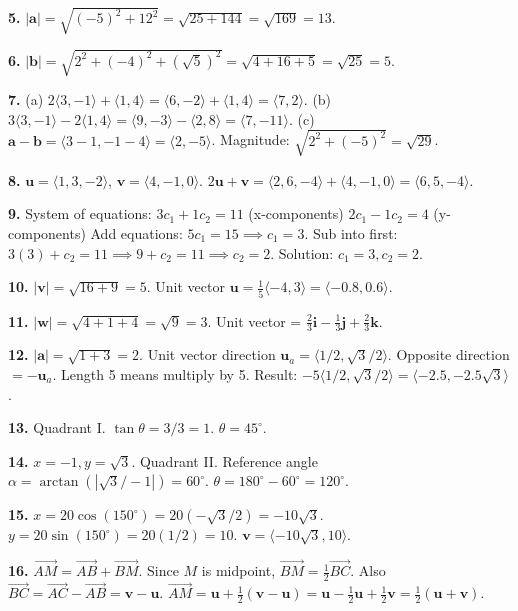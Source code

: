 \documentclass[12pt]{article}
\begin{document}
\textbf{5.} $|\mathbf{a}| = \sqrt{(-5)^2 + 12^2} = \sqrt{25 + 144} = \sqrt{169} = 13$.

\textbf{6.} $|\mathbf{b}| = \sqrt{2^2 + (-4)^2 + (\sqrt{5})^2} = \sqrt{4 + 16 + 5} = \sqrt{25} = 5$.

\textbf{7.}
(a) $2\langle 3, -1 \rangle + \langle 1, 4 \rangle = \langle 6, -2 \rangle + \langle 1, 4 \rangle = \langle 7, 2 \rangle$.
(b) $3\langle 3, -1 \rangle - 2\langle 1, 4 \rangle = \langle 9, -3 \rangle - \langle 2, 8 \rangle = \langle 7, -11 \rangle$.
(c) $\mathbf{a}-\mathbf{b} = \langle 3-1, -1-4 \rangle = \langle 2, -5 \rangle$. Magnitude: $\sqrt{2^2+(-5)^2} = \sqrt{29}$.

\textbf{8.} $\mathbf{u} = \langle 1, 3, -2 \rangle$, $\mathbf{v} = \langle 4, -1, 0 \rangle$.
$2\mathbf{u} + \mathbf{v} = \langle 2, 6, -4 \rangle + \langle 4, -1, 0 \rangle = \langle 6, 5, -4 \rangle$.

\textbf{9.} System of equations:
$3c_1 + 1c_2 = 11$ (x-components)
$2c_1 - 1c_2 = 4$ (y-components)
Add equations: $5c_1 = 15 \implies c_1 = 3$.
Sub into first: $3(3) + c_2 = 11 \implies 9 + c_2 = 11 \implies c_2 = 2$.
Solution: $c_1=3, c_2=2$.

\textbf{10.} $|\mathbf{v}| = \sqrt{16+9} = 5$. Unit vector $\mathbf{u} = \frac{1}{5}\langle -4, 3 \rangle = \langle -0.8, 0.6 \rangle$.

\textbf{11.} $|\mathbf{w}| = \sqrt{4+1+4} = \sqrt{9} = 3$. Unit vector = $\frac{2}{3}\mathbf{i} - \frac{1}{3}\mathbf{j} + \frac{2}{3}\mathbf{k}$.

\textbf{12.} $|\mathbf{a}| = \sqrt{1+3} = 2$. Unit vector direction $\mathbf{u}_a = \langle 1/2, \sqrt{3}/2 \rangle$.
Opposite direction $= -\mathbf{u}_a$. Length 5 means multiply by 5.
Result: $-5 \langle 1/2, \sqrt{3}/2 \rangle = \langle -2.5, -2.5\sqrt{3} \rangle$.

\textbf{13.} Quadrant I. $\tan \theta = 3/3 = 1$. $\theta = 45^\circ$.

\textbf{14.} $x=-1, y=\sqrt{3}$. Quadrant II. Reference angle $\alpha = \arctan(|\sqrt{3}/-1|) = 60^\circ$.
$\theta = 180^\circ - 60^\circ = 120^\circ$.

\textbf{15.} $x = 20 \cos(150^\circ) = 20(-\sqrt{3}/2) = -10\sqrt{3}$.
$y = 20 \sin(150^\circ) = 20(1/2) = 10$.
$\mathbf{v} = \langle -10\sqrt{3}, 10 \rangle$.

\textbf{16.} $\vec{AM} = \vec{AB} + \vec{BM}$. Since $M$ is midpoint, $\vec{BM} = \frac{1}{2}\vec{BC}$.
Also $\vec{BC} = \vec{AC} - \vec{AB} = \mathbf{v} - \mathbf{u}$.
$\vec{AM} = \mathbf{u} + \frac{1}{2}(\mathbf{v} - \mathbf{u}) = \mathbf{u} - \frac{1}{2}\mathbf{u} + \frac{1}{2}\mathbf{v} = \frac{1}{2}(\mathbf{u} + \mathbf{v})$.
\end{document}
